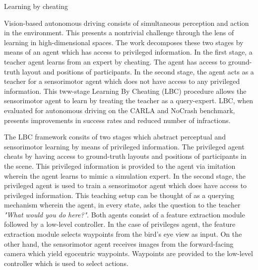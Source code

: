 \documentclass[11pt,letterpaper]{article}
\begin{document}
\begin{center}
  \large{Learning by cheating}
\end{center}

Vision-based autonomous driving consists of simultaneous perception and action in the environment. This presents a nontrivial challenge through the lens of learning in high-dimensional spaces. The work decomposes these two stages by means of an agent which has access to privileged information. In the first stage, a teacher agent learns from an expert by cheating. The agent has access to ground-truth layout and positions of participants. In the second stage, the agent acts as a teacher for a sensorimotor agent which does not have access to any privileged information. This tww-stage Learning By Cheating (LBC) procedure allows the sensorimotor agent to learn by treating the teacher as a query-expert. LBC, when evaluated for autonomous driving on the CARLA and NoCrash benchmark, presents improvements in success rates and reduced number of infractions.

The LBC framework consits of two stages which abstract perceptual and sensorimotor learning by means of privileged information. The privileged agent cheats by having access to ground-truth layouts and positions of participants in the scene. This privileged information is provided to the agent via imitation wherein the agent learns to mimic a simulation expert. In the second stage, the privileged agent is used to train a sensorimotor agent which does have access to privileged information. This teaching setup can be thought of as a querying mechanism wherein the agent, in every state, asks the question to the teacher \textit{"What would you do here?"}. Both agents consist of a feature extraction module followed by a low-level controller. In the case of privileges agent, the feature extraction module selects waypoints from the bird's eye view as input. On the other hand, the sensorimotor agent receives images from the forward-facing camera which yield egocentric waypoints. Waypoints are provided to the low-level controller which is used to select actions. 
\end{document}
